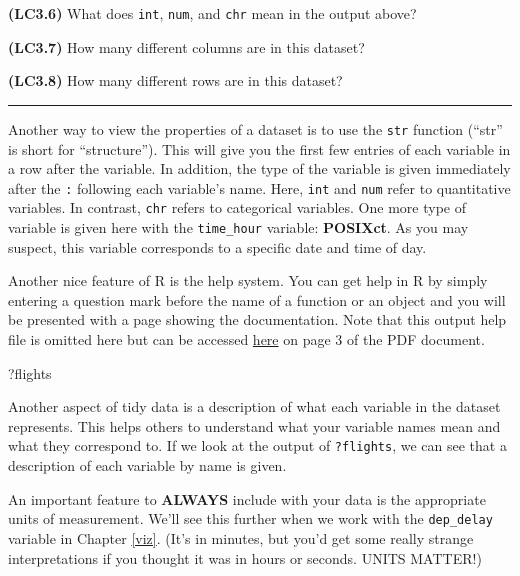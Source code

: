 \documentclass[]{tufte-book}
\newenvironment{Shaded}{\begin{snugshade}}{\end{snugshade}}
\newcommand{\NormalTok}[1]{{#1}}
\begin{document}
\textbf{(LC3.6)} What does \texttt{int}, \texttt{num}, and \texttt{chr}
mean in the output above?

\textbf{(LC3.7)} How many different columns are in this dataset?

\textbf{(LC3.8)} How many different rows are in this dataset?

\begin{center}\rule{0.5\linewidth}{\linethickness}\end{center}

Another way to view the properties of a dataset is to use the
\texttt{str} function (``str'' is short for ``structure''). This will
give you the first few entries of each variable in a row after the
variable. In addition, the type of the variable is given immediately
after the \texttt{:} following each variable's name. Here, \texttt{int}
and \texttt{num} refer to quantitative variables. In contrast,
\texttt{chr} refers to categorical variables. One more type of variable
is given here with the \texttt{time\_hour} variable: \textbf{POSIXct}.
As you may suspect, this variable corresponds to a specific date and
time of day.

Another nice feature of R is the help system. You can get help in R by
simply entering a question mark before the name of a function or an
object and you will be presented with a page showing the documentation.
Note that this output help file is omitted here but can be accessed
\href{https://cran.r-project.org/web/packages/nycflights13/nycflights13.pdf}{here}
on page 3 of the PDF document.

\begin{Shaded}
\begin{Highlighting}[]
\NormalTok{?flights}
\end{Highlighting}
\end{Shaded}

Another aspect of tidy data is a description of what each variable in
the dataset represents. This helps others to understand what your
variable names mean and what they correspond to. If we look at the
output of \texttt{?flights}, we can see that a description of each
variable by name is given.

An important feature to \textbf{ALWAYS} include with your data is the
appropriate units of measurement. We'll see this further when we work
with the \texttt{dep\_delay} variable in Chapter \ref{viz}. (It's in
minutes, but you'd get some really strange interpretations if you
thought it was in hours or seconds. UNITS MATTER!)
\end{document}
